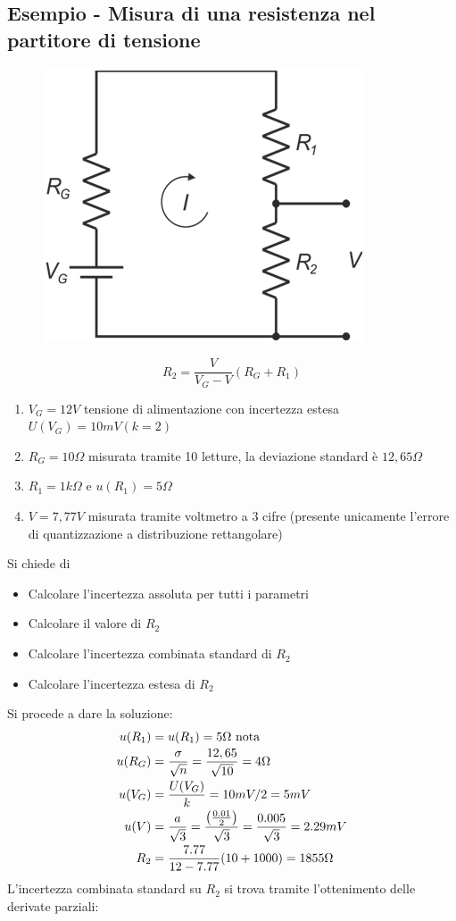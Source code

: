 \documentclass[a4paper, 15pt]{article}
\begin{document}
\subsection{Esempio - Misura di una resistenza nel partitore di tensione}
\begin{adjustwidth}{2in}{}  		
\begin{figure}[H]
	\centering
	\label{fig:screenshot005}
	\includegraphics[width=0.3\linewidth]{fig/screenshot005}
\end{figure}
  		\[R_2 = \dfrac{V}{V_G-V}(R_G+R_1)\]
  		\begin{enumerate}
  			\item $ V_G=12V $ tensione di alimentazione con incertezza estesa $ U(V_G)=10mV (k=2) $
  			\item $ R_G=10\Omega $ misurata tramite 10 letture, la deviazione standard è $ 12,65 \Omega $
  			\item $ R_1=1k\Omega $ e $ u(R_1)=5\Omega $
  			\item $ V=7,77V $ misurata tramite voltmetro a 3 cifre (presente unicamente l’errore di
  			quantizzazione a distribuzione rettangolare)
  		\end{enumerate}
  		Si chiede di 
  		\begin{itemize}
  			\item Calcolare l’incertezza assoluta per tutti i parametri
  			\item Calcolare il valore di $ R_2 $
  			\item Calcolare l’incertezza combinata standard di $ R_2 $
  			\item Calcolare l’incertezza estesa di $ R_2 $  		
  		\end{itemize}
  		Si procede a dare la soluzione:
  		\[ \begin{array}{c}
  			\begin{aligned}
  				u(R_1) & = u(R_1)=5\Omega ~ \text{nota} \\
  				u(R_G) & = {\sigma\over\sqrt{n}} = {12,65\over\sqrt{10}} = 4\Omega \\
  				u(V_G) & = {U(V_G)\over k} = 10mV/2 = 5mV \\
  				u(V)  & = {a\over\sqrt{3}} = {\left(0.01\over2\right)\over\sqrt{3}} = {0.005\over\sqrt{3}} = 2.29mV \\
  				R_2 & = \dfrac{7.77}{12-7.77}(10+1000) = 1855\Omega  					
  			\end{aligned}
  		\end{array}
  		 \]
  		 L'incertezza combinata standard su $R_2$ si trova tramite l'ottenimento delle derivate parziali:
  		\end{adjustwidth}
\end{document}

